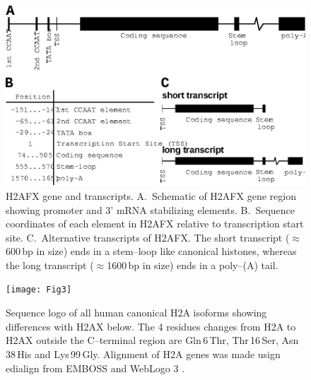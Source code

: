 \documentclass[graybox]{svmult}
\begin{document}
\newpage

\begin{figure}
\includegraphics{Fig2}
\caption{H2AFX gene and transcripts. A.~Schematic of H2AFX gene region showing promoter and  3' mRNA
stabilizing elements. B.~Sequence coordinates of each element in H2AFX relative to transcription
start site\@. C.~Alternative transcripts of H2AFX\@. The short transcript  ($\approx$600\,bp in size) ends
in a stem--loop like canonical histones, whereas the long transcript ($\approx$1600\,bp in size) ends
in a poly--(A) tail.}
\label{fig:H2AFX}
\end{figure}

\newpage

\begin{figure}
\sidecaption
\texttt{[image: Fig3]}
\caption{Sequence logo of all human canonical H2A isoforms showing differences with H2AX below. The
4 residues changes from H2A to H2AX outside the C--terminal region are Gln\,6\,Thr, Thr\,16\,Ser, Asn\,38\,His
and Lys\,99\,Gly. Alignment of H2A genes was made usign edialign \protect\cite{Mor99} from EMBOSS
\protect\cite{RLB00} and WebLogo 3 \protect\cite{CHC+04}.}
\label{fig:H2AX-logo}
\end{figure}

\newpage
\end{document}

